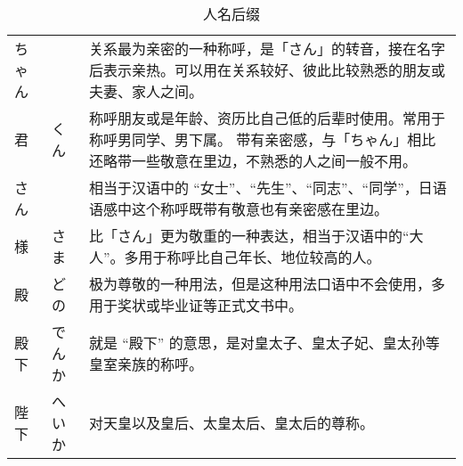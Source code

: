 \begin{table}[h]
  \centering
  \caption{人名后缀}
  \label{tab:number}
  \small
  \begin{tabularx}{\textwidth}{llX}
    ちゃん & & 关系最为亲密的一种称呼，是「さん」的转音，接在名字后表示亲热。可以用在关系较好、彼此比较熟悉的朋友或夫妻、家人之间。 \\
    君 & くん & 称呼朋友或是年龄、资历比自己低的后辈时使用。常用于称呼男同学、男下属。
                带有亲密感，与「ちゃん」相比还略带一些敬意在里边，不熟悉的人之间一般不用。\\
    さん & & 相当于汉语中的 ``女士''、``先生''、``同志''、``同学''，日语语感中这个称呼既带有敬意也有亲密感在里边。\\
    様 & さま & 比「さん」更为敬重的一种表达，相当于汉语中的``大人''。多用于称呼比自己年长、地位较高的人。\\
    殿 & どの & 极为尊敬的一种用法，但是这种用法口语中不会使用，多用于奖状或毕业证等正式文书中。\\
    殿下 & でんか & 就是 ``殿下'' 的意思，是对皇太子、皇太子妃、皇太孙等皇室亲族的称呼。 \\
    陛下 & へいか & 对天皇以及皇后、太皇太后、皇太后的尊称。\\
  \end{tabularx}
\end{table}


